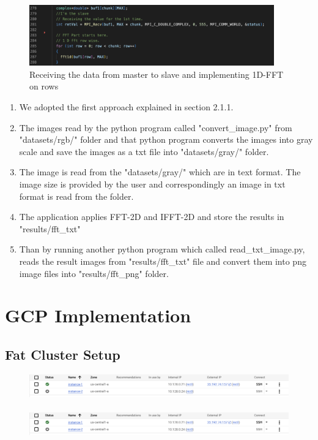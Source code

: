 \documentclass{article}
\begin{document}
\begin{figure}[h]
    \centering
    \includegraphics[width=400px]{mpirecv.png}
    \caption{Receiving the data from master to slave and implementing 1D-FFT on rows}
    \label{fig:Receiving}
\end{figure}
\newpage
\begin{enumerate}
    \item We adopted the first approach explained in section 2.1.1.
    \item The images read by the python program called "convert\_image.py" from "datasets/rgb/" folder and that python program converts the images into gray scale and save the images as a txt file into "datasets/gray/" folder.
    \item The image  is read from the "datasets/gray/" which are in text format. The image size is provided by the user and correspondingly an image in txt format is read from the folder. 
    \item The application applies FFT-2D and IFFT-2D and store the results in "results/fft\_txt"
    \item Than by running another python program which called read\_txt\_image.py, reads the result images from  "results/fft\_txt" file and convert them into png image files into "results/fft\_png" folder.
\end{enumerate}
\newpage
\section{GCP Implementation}
\subsection{Fat Cluster Setup}

\begin{figure}[h]
    \includegraphics[width=.90\textwidth]{fatcluster.png}
\\[\smallskipamount]
\\[\smallskipamount]
    \includegraphics[width=.90\textwidth]{FatCluster.png}
\end{figure}
\newpage
\end{document}
